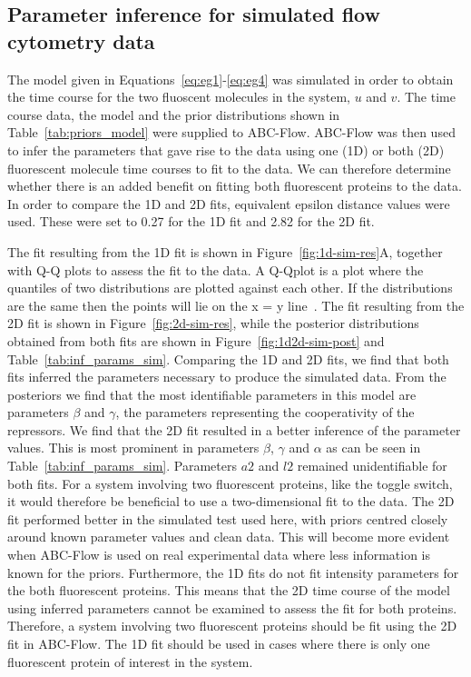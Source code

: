 \subsection{Parameter inference for simulated flow cytometry data}

The model given in Equations~\ref{eq:eg1}-\ref{eq:eg4} was simulated in order to obtain the time course for the two fluoscent molecules in the system, $u$ and $v$. The  time course data, the model and the prior distributions shown in Table~\ref{tab:priors_model} were supplied to ABC-Flow. ABC-Flow was then used to infer the parameters that gave rise to the data using one (1D) or both (2D) fluorescent molecule time courses to fit to the data. We can therefore determine whether there is an added benefit on fitting both fluorescent proteins to the data. In order to compare the 1D and 2D fits, equivalent epsilon distance values were used. These were set to 0.27 for the 1D fit and 2.82 for the 2D fit.

The fit resulting from the 1D fit is shown in Figure~\ref{fig:1d-sim-res}A, together with Q-Q plots to assess the fit to the data. A Q-Qplot is a plot where the quantiles of two distributions are plotted against each other. If the distributions are the same then the points will lie on the x = y line~\autocite{Wilk:1968ts}. The fit resulting from the 2D fit is shown in Figure~\ref{fig:2d-sim-res}, while the posterior distributions obtained from both fits are shown in Figure~\ref{fig:1d2d-sim-post} and Table~\ref{tab:inf_params_sim}. Comparing the 1D and 2D fits, we find that both fits inferred the parameters necessary to produce the simulated data. From the posteriors we find that the most identifiable parameters in this model are parameters $β$ and $γ$, the parameters representing the cooperativity of the repressors. We find that the 2D fit resulted in a better inference of the parameter values. This is most prominent in parameters $β$, $γ$ and $α$ as can be seen in Table~\ref{tab:inf_params_sim}. Parameters $a2$ and $l2$ remained unidentifiable for both fits. For a system involving two fluorescent proteins, like the toggle switch, it would therefore be beneficial to use a two-dimensional fit to the data. The 2D fit performed better in the simulated test used here, with priors centred closely around known parameter values and clean data. This will become more evident when ABC-Flow is used on real experimental data where less information is known for the priors. Furthermore, the 1D fits do not fit intensity parameters for the both fluorescent proteins. This means that the 2D time course of the model using inferred parameters cannot be examined to assess the fit for both proteins. Therefore, a system involving two fluorescent proteins should be fit using the 2D fit in ABC-Flow. The 1D fit should be used in cases where there is only one fluorescent protein of interest in the system. 

